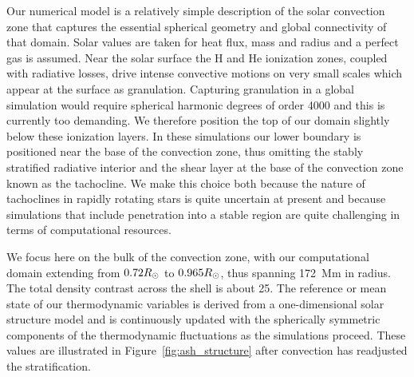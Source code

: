 Our numerical model is a relatively simple description of the solar
convection zone that captures the essential spherical geometry and
global connectivity of that domain.  Solar values are taken for heat
flux, mass and radius and a perfect gas is assumed.  Near the solar
surface the H and He ionization zones, coupled with radiative losses,
drive intense convective motions on very small scales which appear at
the surface as granulation.  Capturing granulation in a global
simulation would require spherical harmonic degrees of order 4000 and
this is currently too demanding.  We therefore position the top of our
domain slightly below these ionization layers.  In these simulations
our lower boundary is positioned near the base of the
convection zone, thus omitting the stably stratified
radiative interior and the shear layer at the base of the convection
zone known as the tachocline.  We make this choice both because the
nature of tachoclines in rapidly rotating stars is quite uncertain at
present and because simulations that include penetration into a stable
region are quite challenging in terms of computational resources. 

\clearpage
We focus here on the bulk of the convection zone, with our computational
domain extending from $0.72R_{\odot}$ to $0.965R_{\odot}$, thus spanning
172~Mm in radius.  The total density contrast across the shell is
about 25.  The reference or mean state of our thermodynamic variables
is derived from a one-dimensional solar structure model
\citep{Brun_et_al_2002} and is continuously updated with the
spherically symmetric components of the thermodynamic fluctuations as
the simulations proceed.  These values are illustrated in
Figure~\ref{fig:ash_structure} after convection has readjusted the
stratification.

